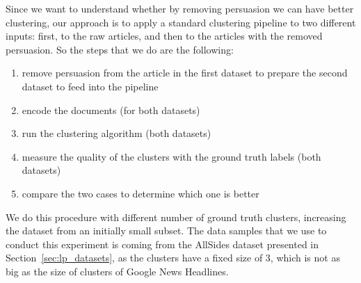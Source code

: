 Since we want to understand whether by removing persuasion we can have better clustering, our approach is to apply a standard clustering pipeline to two different inputs: first, to the raw articles, and then to the articles with the removed persuasion. So the steps that we do are the following: %
\begin{enumerate}
    \item remove persuasion from the article in the first dataset to prepare the second dataset to feed into the pipeline
    \item encode the documents (for both datasets)
    \item run the clustering algorithm (both datasets)
    \item measure the quality of the clusters with the ground truth labels (both datasets)
    \item compare the two cases to determine which one is better
\end{enumerate}

We do this procedure with different number of ground truth clusters, increasing the dataset from an initially small subset.%
The data samples that we use to conduct this experiment is coming from the AllSides dataset presented in Section~\ref{sec:lp_datasets}, as the clusters have a fixed size of 3, which is not as big as the size of clusters of Google News Headlines.



